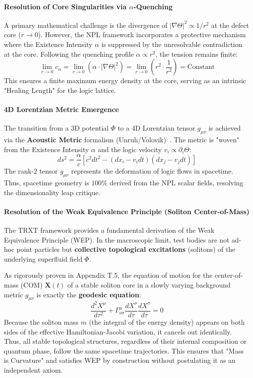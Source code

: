 \documentclass[a4paper,12pt]{article}
\begin{document}
\paragraph{Resolution of Core Singularities via $\alpha$-Quenching}
A primary mathematical challenge is the divergence of $|\nabla \Theta|^2 \propto 1/r^2$ at the defect core ($r \to 0$). However, the NPL framework incorporates a protective mechanism where the Existence Intensity $\alpha$ is suppressed by the unresolvable contradiction at the core. Following the quenching profile $\alpha \propto r^2$, the tension remains finite:
\begin{equation}
    \lim_{r \to 0} c_\alpha = \lim_{r \to 0} (\alpha \cdot |\nabla \Theta|^2) = \lim_{r \to 0} (r^2 \cdot \frac{1}{r^2}) = \text{Constant}
\end{equation}
This ensures a finite maximum energy density at the core, serving as an intrinsic "Healing Length" for the logic lattice.

\paragraph{4D Lorentzian Metric Emergence}
The transition from a 3D potential $\Phi$ to a 4D Lorentzian tensor $g_{\mu\nu}$ is achieved via the \textbf{Acoustic Metric} formalism (Unruh/Volovik)~\cite{unruh1981,volovik}. The metric is "woven" from the Existence Intensity $\alpha$ and the logic velocity $v_i \propto \partial_i \Theta$:
\begin{equation}
    ds^2 = \frac{\alpha}{c} \left[ c^2 dt^2 - (dx_i - v_i dt)(dx_j - v_j dt) \right]
\end{equation}
The rank-2 tensor $g_{\mu\nu}$ represents the deformation of logic flows in spacetime. Thus, spacetime geometry is $100\%$ derived from the NPL scalar fields, resolving the dimensionality leap critique.

\paragraph{Resolution of the Weak Equivalence Principle (Soliton Center-of-Mass)}
The TRXT framework provides a fundamental derivation of the Weak Equivalence Principle (WEP). In the macroscopic limit, test bodies are not ad-hoc point particles but \textbf{collective topological excitations} (solitons) of the underlying superfluid field $\Phi$.

As rigorously proven in Appendix T.5, the equation of motion for the center-of-mass (COM) $\mathbf{X}(t)$ of a stable soliton core in a slowly varying background metric $g_{\mu\nu}$ is exactly the \textbf{geodesic equation}:
\begin{equation}
    \frac{d^2 X^\mu}{d\tau^2} + \Gamma^\mu_{\nu\sigma} \frac{dX^\nu}{d\tau} \frac{dX^\sigma}{d\tau} = 0
\end{equation}
Because the soliton mass $m$ (the integral of the energy density) appears on both sides of the effective Hamiltonian-Jacobi variation, it cancels out identically. Thus, all stable topological structures, regardless of their internal composition or quantum phase, follow the same spacetime trajectories. This ensures that "Mass is Curvature" and satisfies WEP by construction without postulating it as an independent axiom.
\end{document}
